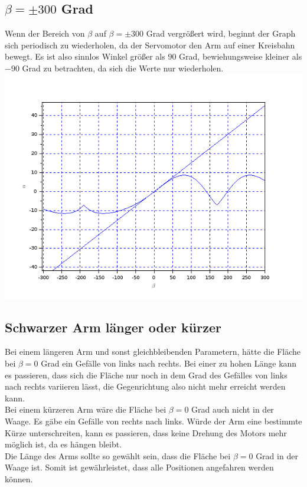 \subsection{$\beta = \pm 300$ Grad}
Wenn der Bereich von $\beta$ auf $\beta=\pm300$ Grad vergrößert wird, beginnt der Graph sich periodisch zu wiederholen, da der Servomotor den Arm auf einer Kreisbahn bewegt. Es ist also sinnlos Winkel größer als $90$ Grad, bewiehungsweise kleiner als $-90$ Grad zu betrachten, da sich die Werte nur wiederholen. \\
\includegraphics[scale=0.5]{images/plot2.png}

\subsection{Schwarzer Arm länger oder kürzer}
Bei einem längeren Arm und sonst gleichbleibenden Parametern, hätte die Fläche bei $\beta = 0$ Grad ein Gefälle von links nach rechts. Bei einer zu hohen Länge kann es passieren, dass sich die Fläche nur noch in dem Grad des Gefälles von links nach rechts variieren lässt, die Gegenrichtung also nicht mehr erreicht werden kann. \\
Bei einem kürzeren Arm wäre die Fläche bei $\beta = 0$ Grad auch nicht in der Waage. Es gäbe ein Gefälle von rechts nach links. Würde der Arm eine bestimmte Kürze unterschreiten, kann es passieren, dass keine Drehung des Motors mehr möglich ist, da es hängen bleibt. \\
Die Länge des Arms sollte so gewählt sein, dass die Fläche bei $\beta = 0$ Grad in der Waage ist. Somit ist gewährleistet, dass alle Positionen angefahren werden können.